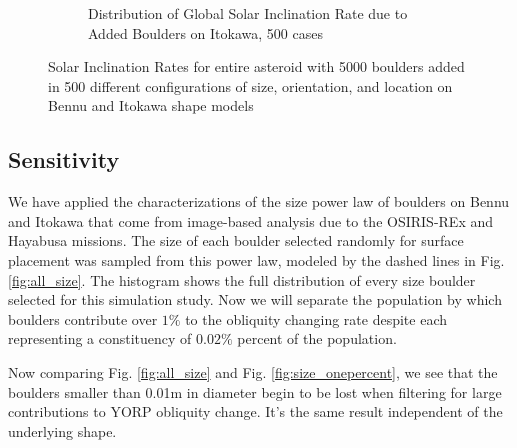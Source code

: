 \begin{figure}
\begin{subfigure}{0.49\textwidth}
        \caption{Distribution of Global Solar Inclination Rate due to Added Boulders on Itokawa, 500 cases}
    \end{subfigure}  
    \caption{Solar Inclination Rates for entire asteroid with 5000 boulders added in 500 different configurations of size, orientation, and location on Bennu and Itokawa shape models}
    \label{fig:is_results}
\end{figure}


\subsection{Sensitivity}

We have applied the characterizations of the size power law of boulders on Bennu and Itokawa that come from image-based analysis due to the OSIRIS-REx and Hayabusa missions. The size of each boulder selected randomly for surface placement was sampled from this power law, modeled by the dashed lines in Fig. \ref{fig:all_size}. The histogram shows the full distribution of every size boulder selected for this simulation study. Now we will separate the population by which boulders contribute over $1\%$ to the obliquity changing rate despite each representing a constituency of $0.02\%$ percent of the population. 


Now comparing Fig. \ref{fig:all_size} and Fig. \ref{fig:size_onepercent}, we see that the boulders smaller than 0.01m in diameter begin to be lost when filtering for large contributions to YORP obliquity change. It's the same result independent of the underlying shape.



